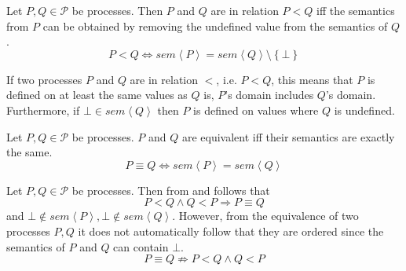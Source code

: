 \begin{definition}
\label{def:process_ordering}
Let $P, Q \in \mathcal{P}$ be processes. Then $P$ and $Q$ are in relation $P < Q$ iff the semantics from $P$ can be obtained by removing the undefined value from the semantics of $Q$.
  \begin{equation}
    P < Q \Leftrightarrow sem \left\langle P \right\rangle = sem \left\langle Q \right\rangle \setminus \left\{ \bot \right\}
  \end{equation}
  \hfill\qedsymbol
\end{definition}



If two processes $P$ and $Q$ are in relation $<$, i.e. $P < Q$, this means that $P$ is defined on at least the same values as $Q$ is, $P$'s domain includes $Q$'s domain. Furthermore, if $\bot \in sem \left\langle Q \right\rangle$ then $P$ is defined on values where $Q$ is undefined.

\begin{definition}
\label{def:process_equivalence}
Let $P, Q \in \mathcal{P}$ be processes. $P$ and $Q$ are equivalent iff their semantics are exactly the same.
  \begin{equation}
    \label{eqn:equivalence}
    P \equiv Q \Leftrightarrow sem \left\langle P \right\rangle = sem \left\langle Q \right\rangle
  \end{equation}
  \hfill\qedsymbol
\end{definition}



\begin{corollary}
\label{crl:equivalence_ordered_processes}
Let $P, Q \in \mathcal{P}$ be processes. Then from  and  follows that
  \begin{equation}
    P < Q \wedge Q < P \Rightarrow P \equiv Q
  \end{equation}
  and $\bot \notin sem \left\langle P \right\rangle, \bot \notin sem \left\langle Q \right\rangle$. However, from the equivalence of two processes $P, Q$ it does not automatically follow that they are ordered since the semantics of $P$ and $Q$ can contain $\bot$.
  \begin{equation}
    P \equiv Q \not\Rightarrow P < Q \wedge Q < P
\end{equation}    
  \hfill\qedsymbol
\end{corollary}

